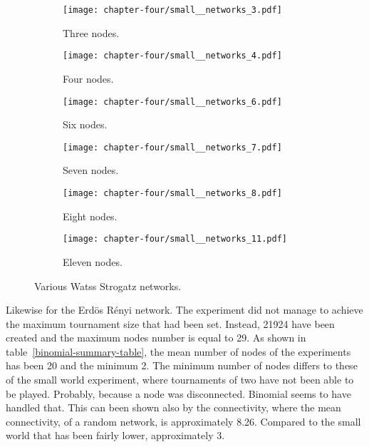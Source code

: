 \begin{figure}[htp!]
	\centering
	\begin{subfigure}[t]{0.30\textwidth}
		\centering
		\texttt{[image: chapter-four/small\_\_networks\_3.pdf]}
		\caption{Three nodes.}
	\end{subfigure}
	\hfill
	\begin{subfigure}[t]{0.30\textwidth}\centering
		\centering
		\texttt{[image: chapter-four/small\_\_networks\_4.pdf]}
		\caption{Four nodes.}
	\end{subfigure}
	\hfill
	\begin{subfigure}[t]{0.30\textwidth}\centering
		\centering
		\texttt{[image: chapter-four/small\_\_networks\_6.pdf]}
		\caption{Six nodes.}
	\end{subfigure}
	\hfill
	\begin{subfigure}[t]{0.30\textwidth}\centering
		\centering
		\texttt{[image: chapter-four/small\_\_networks\_7.pdf]}
		\caption{Seven nodes.}
	\end{subfigure}
	\hfill
	\begin{subfigure}[t]{0.30\textwidth}\centering
		\centering
		\texttt{[image: chapter-four/small\_\_networks\_8.pdf]}
		\caption{Eight nodes.}
	\end{subfigure}
	\hfill
	\begin{subfigure}[t]{0.30\textwidth}\centering
		\centering
		\texttt{[image: chapter-four/small\_\_networks\_11.pdf]}
		\caption{Eleven nodes.}
	\end{subfigure}
	\caption{Various Watss Strogatz networks.}
	\label{small_networks_illustration}
\end{figure}

Likewise for the Erd\"{o}s R\'{e}nyi network. The experiment did not manage to
achieve the maximum tournament size that had been set. Instead, 21924 have been
created and the maximum nodes number is equal to 29. As shown in table~\ref{binomial-summary-table},
the mean number of nodes of the experiments has been 20 and the minimum 2. The
minimum number of nodes differs to these of the small world experiment, where
tournaments of two have not been able to be played. Probably, because a node
was disconnected. Binomial seems to have handled that. This can been shown
also by the connectivity, where the mean connectivity, of a random network, is
approximately 8.26. Compared to the small world that has been fairly lower,
approximately 3.

